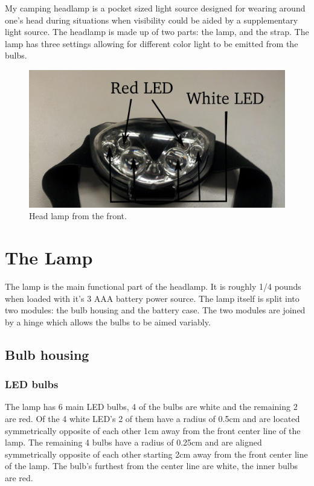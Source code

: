 \documentclass[12pt]{article}
\begin{document}
My camping headlamp is a pocket sized light source designed for wearing around one's head during
situations when visibility could be aided by a supplementary light source. The headlamp is made up
of two parts: the lamp, and the strap. The lamp has three settings allowing for different color
light to be emitted from the bulbs.

\begin{figure}[h!]
\centering
\caption{Head lamp from the front.}
\includegraphics[scale=0.5]{headlamp}
\end{figure}

\section{The Lamp} The lamp is the main functional part of the headlamp. It is roughly 1/4 pounds
when loaded with it's 3 AAA battery power source. The lamp itself is split into two modules: the
bulb housing and the battery case. The two modules are joined by a hinge which allows the bulbs to
be aimed variably.

\subsection{Bulb housing}
\subsubsection{LED bulbs} The lamp has 6 main LED bulbs, 4 of the bulbs
are white and the remaining 2 are red. Of the 4 white LED's 2 of them have a radius of 0.5cm and are
located symmetrically opposite of each other 1cm away from the front center line of the lamp.  The
remaining 4 bulbs have a radius of 0.25cm and are aligned symmetrically opposite of each other
starting 2cm away from the front center line of the lamp. The bulb's furthest from the center line
are white, the inner bulbs are red.
\end{document}
